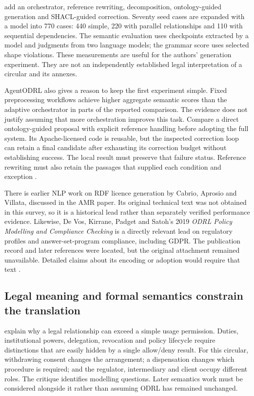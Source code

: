 \citet{agentodrl2026} add an orchestrator, reference rewriting, decomposition,
ontology-guided generation and SHACL-guided correction. Seventy seed cases are
expanded with a model into 770 cases: 440 simple, 220 with parallel relationships
and 110 with sequential dependencies. The semantic evaluation uses checkpoints
extracted by a model and judgments from two language models; the grammar score
uses selected shape violations. These measurements are useful for the authors'
generation experiment. They are not an independently established legal
interpretation of a circular and its annexes.

AgentODRL also gives a reason to keep the first experiment simple. Fixed
preprocessing workflows achieve higher aggregate semantic scores than the
adaptive orchestrator in parts of the reported comparison. The evidence does
not justify assuming that more orchestration improves this task. Compare a
direct ontology-guided proposal with explicit reference handling before adopting
the full system. Its Apache-licensed code is reusable, but the inspected
correction loop can retain a final candidate after exhausting its correction
budget without establishing success. The local result must preserve that failure
status. Reference rewriting must also retain the passages that supplied each
condition and exception \citep{agentodrl2026,hkmaodrlsoftware2026}.

There is earlier NLP work on RDF licence generation by Cabrio, Aprosio and
Villata, discussed in the AMR paper. Its original technical text was not
obtained in this survey, so it is a historical lead rather than separately
verified performance evidence. Likewise, De Vos, Kirrane, Padget and Satoh's
2019 \emph{ODRL Policy Modelling and Compliance Checking} is a directly
relevant lead on regulatory profiles and answer-set-program compliance,
including GDPR. The publication record and later references were located,
but the original attachment remained unavailable. Detailed claims about its
encoding or adoption would require that text
\citep{revelodrl2023,hkmaodrlsurvey2026}.

\subsection{Legal meaning and formal semantics constrain the translation}

\citet{criticalodrl2021} explain why a legal relationship can exceed a simple
usage permission. Duties, institutional powers, delegation, revocation and
policy lifecycle require distinctions that are easily hidden by a single
allow/deny result. For this circular, withdrawing consent changes the
arrangement; a dispensation changes which procedure is required; and the
regulator, intermediary and client occupy different roles. The critique
identifies modelling questions. Later semantics work must be considered
alongside it rather than assuming ODRL has remained unchanged.

